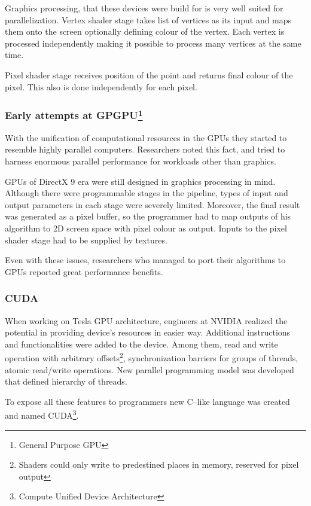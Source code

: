 Graphics processing, that these devices were build for is very well suited for
parallelization. Vertex shader stage takes list of vertices as its input and
maps them onto the screen optionally defining colour of the vertex. Each
vertex is processed independently making it possible to process many vertices
at the same time.

Pixel shader stage receives position of the point and returns final colour of
the pixel. This also is done independently for each pixel.

\subsubsection[Early attempts at GPGPU]{Early attempts at GPGPU\footnote{General Purpose GPU}}

With the unification of computational resources in the GPUs they started to
resemble highly parallel computers. Researchers noted this fact, and tried to
harness enormous parallel performance for workloads other than graphics.

GPUs of DirectX 9 era were still designed in graphics processing in mind.
Although there were programmable stages in the pipeline, types of input and
output parameters in each stage were severely limited. Moreover, the final
result was generated as a pixel buffer, so the programmer had to map outputs of
his algorithm to 2D screen space with pixel colour as output. Inputs to the
pixel shader stage had to be supplied by textures.

Even with these issues, researchers who managed to port their algorithms to
GPUs reported great performance benefits.

\subsubsection{CUDA}

When working on Tesla GPU architecture, engineers at NVIDIA realized the
potential in providing device's resources in easier way. Additional instructions
and functionalities were added to the device. Among them, read and write
operation with arbitrary offsets\footnote{Shaders could only write to predestined
places in memory, reserved for pixel output}, synchronization barriers for
groups of threads, atomic read/write operations. New parallel programming model
was developed that defined hierarchy of threads.

To expose all these features to programmers new C--like language was
created and named CUDA\footnote{Compute Unified Device Architecture}.


